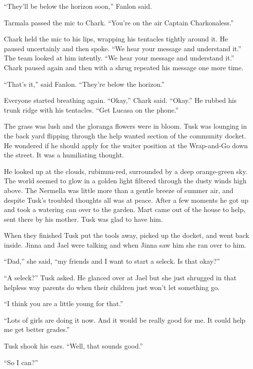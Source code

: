 ``They'll be below the horizon soon,'' Fanlon said.

Tarmala passed the mic to Chark. ``You're on the air Captain Charkonaless.''

Chark held the mic to his lips, wrapping his tentacles tightly around it. He paused uncertainly
and then spoke. ``We hear your message and understand it.'' The team looked at him intently.
``We hear your message and understand it.'' Chark paused again and then with a shrug repeated
his message one more time.

``That's it,'' said Fanlon. ``They're below the horizon.''

Everyone started breathing again. ``Okay,'' Chark said. ``Okay.'' He rubbed his trunk ridge with
his tentacles. ``Get Lucasa on the phone.''

\spacebreak

The grass was lush and the gloranga flowers were in bloom. Tusk was lounging in the back yard
flipping through the help wanted section of the community docket. He wondered if he should apply
for the waiter position at the Wrap-and-Go down the street. It was a humiliating thought.

He looked up at the clouds, rubinum-red, surrounded by a deep orange-green sky. The world seemed
to glow in a golden light filtered through the dusty winds high above. The Nermella was little
more than a gentle breeze of summer air, and despite Tusk's troubled thoughts all was at peace.
After a few moments he got up and took a watering can over to the garden. Mart came out of the
house to help, sent there by his mother. Tusk was glad to have him.

When they finished Tusk put the tools away, picked up the docket, and went back inside. Jinna
and Jael were talking and when Jinna saw him she ran over to him.

``Dad,'' she said, ``my friends and I want to start a seleck. Is that okay?''

``A seleck?'' Tusk asked. He glanced over at Jael but she just shrugged in that helpless way
parents do when their children just won't let something go.

``I think you are a little young for that.''

``Lots of girls are doing it now. And it would be really good for me. It could help me get
better grades.''

Tusk shook his ears. ``Well, that sounds good.''

``So I can?''

